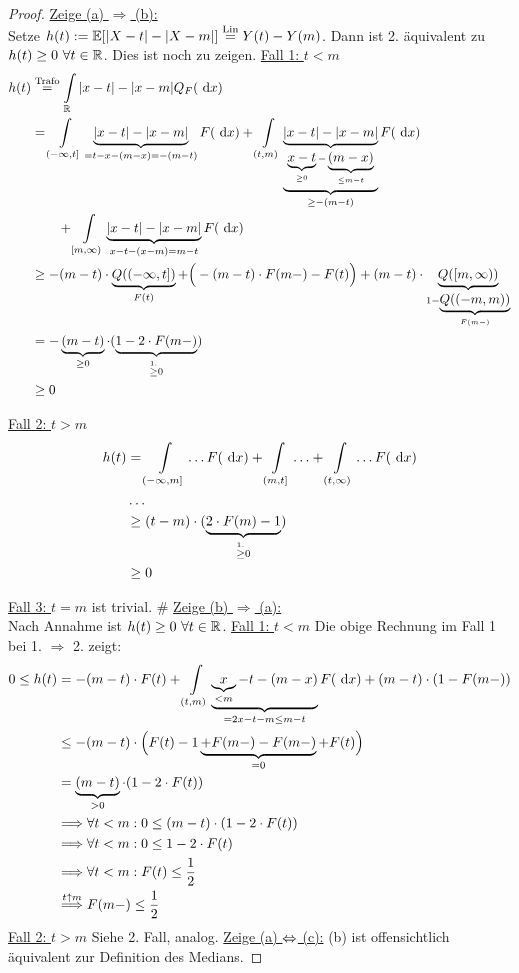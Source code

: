 \begin{proof}
\underline{Zeige (a) $\Rightarrow$ (b):}\\
Setze $h(t):=\mathbb{E}[|X-t|-|X-m|]\stackrel{\text{Lin}}{=}Y(t)-Y(m)$. Dann ist 2. äquivalent zu $h(t)\geq0~\forall t\in\mathbb{R}$. Dies ist noch zu zeigen.\nl
\underline{Fall 1: $t<m$}
\begin{align*}
h(t)&\stackrel{\text{Trafo}}{=}
\int\limits_{\mathbb{R}}|x-t|-|x-m| Q_F(\text{ d} x)\\
&=\int\limits_{(-\infty,t]}\underbrace{|x-t|-|x-m|}_{=t-x-(m-x)=-(m-t)} F(\text{ d} x)
+\int\limits_{(t,m)}\underbrace{\underbrace{|x-t|-|x-m|}_{\underbrace{x-t}_{\geq0}-\underbrace{(m-x)}_{\leq m-t}}}_{\geq-(m-t)} F(\text{ d} x)\\
&\qquad
+\int\limits_{[m,\infty)}\underbrace{|x-t|-|x-m|}_{x-t-(x-m)=m-t} F(\text{ d} x)\\
&\geq-(m-t)\cdot \underbrace{Q((-\infty,t])}_{F(t)}+
\Big(-(m-t)\cdot F(m-)-F(t)\Big)
+(m-t)\cdot\underbrace{Q([m,\infty))}_{1-\underbrace{Q((-m,m))}_{F(m-)}}\\
&=-\underbrace{(m-t)}_{\geq0}\cdot(\underbrace{1-2\cdot F(m-)}_{\stackrel{1.}{\geq}0})\\
&\geq0
\end{align*}

\underline{Fall 2: $t> m$}
\begin{align*}
h(t)&=\int\limits_{(-\infty,m]}\ldots F(\text{ d} x)+\int\limits_{(m,t]}\ldots+\int\limits_{(t,\infty)}\ldots F(\text{ d} x)\\
&\ldots\\
&\geq(t-m)\cdot(\underbrace{2\cdot F(m)-1}_{\stackrel{1.}{\geq}0})\\
&\geq0
\end{align*}

\underline{Fall 3: $t=m$} ist trivial. $\#$\nl
\underline{Zeige (b) $\Rightarrow$ (a):}\\
Nach Annahme ist $h(t)\geq0~\forall t\in\mathbb{R}$.\nl
\underline{Fall 1: $t<m$} Die obige Rechnung im Fall 1 bei 1. $\Rightarrow$ 2. zeigt:
\begin{align*}
0\leq h(t)&=-(m-t)\cdot F(t)+\int\limits_{(t,m)}\underbrace{\underbrace{x}_{<m}-t-(m-x) }_{=2x-t-m\leq m-t}F(\text{ d} x)+(m-t)\cdot(1-F(m-))\\
&\leq-(m-t)\cdot\Big(F(t)-1\underbrace{+F(m-)-F(m-)}_{=0}+F(t)\Big)\\
&=\underbrace{(m-t)}_{>0}\cdot(1-2\cdot F(t))\\
&\Longrightarrow\forall t<m:0\leq(m-t)\cdot(1-2\cdot F(t))\\
&\Longrightarrow\forall t<m:0\leq 1-2\cdot F(t)\\
&\Longrightarrow\forall t<m:F(t)\leq\frac{1}{2}\\
&\stackrel{t\uparrow m}{\Longrightarrow}F(m-)\leq\frac{1}{2}
\end{align*}
\underline{Fall 2: $t> m$} Siehe 2. Fall, analog.\nl
\underline{Zeige (a) $\Leftrightarrow$ (c):}
(b) ist offensichtlich äquivalent zur Definition des Medians.
\end{proof}

